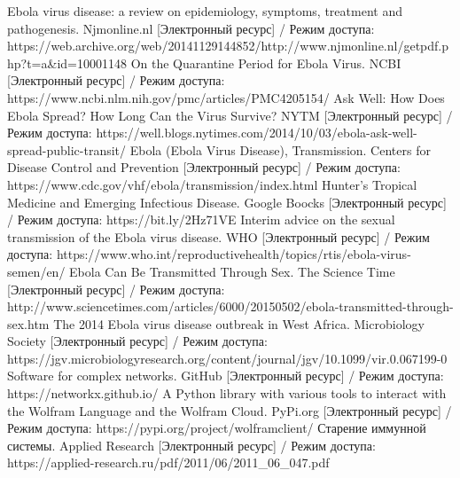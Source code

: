 \begin{thebibliography}{}
	 Ebola virus disease: a review on epidemiology,
	symptoms, treatment and pathogenesis. Njmonline.nl  [Электронный ресурс] / Режим доступа: https://web.archive.org/web/20141129144852/http://www.njmonline.nl/getpdf.php?t=a\&id=10001148
	 On the Quarantine Period for Ebola Virus. NCBI [Электронный ресурс] / Режим доступа: https://www.ncbi.nlm.nih.gov/pmc/articles/PMC4205154/
	 Ask Well: How Does Ebola Spread? How Long Can the Virus Survive? NYTM  [Электронный ресурс] / Режим доступа: https://well.blogs.nytimes.com/2014/10/03/ebola-ask-well-spread-public-transit/	
	 Ebola (Ebola Virus Disease), Transmission. Centers for Disease Control and Prevention   [Электронный ресурс] / Режим доступа: https://www.cdc.gov/vhf/ebola/transmission/index.html
	 Hunter's Tropical Medicine and Emerging Infectious Disease. Google Boocks [Электронный ресурс] / Режим доступа: https://bit.ly/2Hz71VE
	 Interim advice on the sexual transmission of the Ebola virus disease. WHO [Электронный ресурс] / Режим доступа: https://www.who.int/reproductivehealth/topics/rtis/ebola-virus-semen/en/
	 Ebola Can Be Transmitted Through Sex. The Science Time [Электронный ресурс] / Режим доступа: http://www.sciencetimes.com/articles/6000/20150502/ebola-transmitted-through-sex.htm 
	 The 2014 Ebola virus disease outbreak in West Africa. Microbiology Society [Электронный ресурс] / Режим доступа:  https://jgv.microbiologyresearch.org/content/journal/jgv/10.1099/vir.0.067199-0
	 Software for complex networks. GitHub [Электронный ресурс] / Режим доступа: https://networkx.github.io/
	 A Python library with various tools to interact with the Wolfram Language and the Wolfram Cloud. PyPi.org [Электронный ресурс] / Режим доступа: https://pypi.org/project/wolframclient/
	 Старение иммунной системы. Applied Research  [Электронный ресурс] / Режим доступа: https://applied-research.ru/pdf/2011/06/2011\_06\_047.pdf
\end{thebibliography}